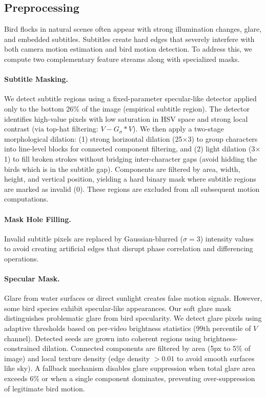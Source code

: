 \subsection{Preprocessing}
\label{sec:preprocessing}

Bird flocks in natural scenes often appear with strong illumination changes, glare, and embedded subtitles. Subtitles create hard edges that severely interfere with both camera motion estimation and bird motion detection. To address this, we compute two complementary feature streams along with specialized masks.

\paragraph{Subtitle Masking.}
We detect subtitle regions using a fixed-parameter specular-like detector applied only to the bottom 26\% of the image (empirical subtitle region). The detector identifies high-value pixels with low saturation in HSV space and strong local contrast (via top-hat filtering: $V - G_\sigma * V$). We then apply a two-stage morphological dilation: (1) strong horizontal dilation (25$\times$3) to group characters into line-level blocks for connected component filtering, and (2) light dilation (3$\times$1) to fill broken strokes without bridging inter-character gaps (avoid hidding the birds which is in the subtitle gap). Components are filtered by area, width, height, and vertical position, yielding a hard binary mask where subtitle regions are marked as invalid (0). These regions are excluded from all subsequent motion computations.

\paragraph{Mask Hole Filling.}
Invalid subtitle pixels are replaced by Gaussian-blurred ($\sigma=3$) intensity values to avoid creating artificial edges that disrupt phase correlation and differencing operations.

\paragraph{Specular Mask.} 
Glare from water surfaces or direct sunlight creates false motion signals. However, some bird species exhibit specular-like appearances. Our soft glare mask distinguishes problematic glare from bird specularity. We detect glare pixels using adaptive thresholds based on per-video brightness statistics (99th percentile of $V$ channel). Detected seeds are grown into coherent regions using brightness-constrained dilation. Connected components are filtered by area (5px to 5\% of image) and local texture density (edge density $> 0.01$ to avoid smooth surfaces like sky). A fallback mechanism disables glare suppression when total glare area exceeds 6\% or when a single component dominates, preventing over-suppression of legitimate bird motion.

